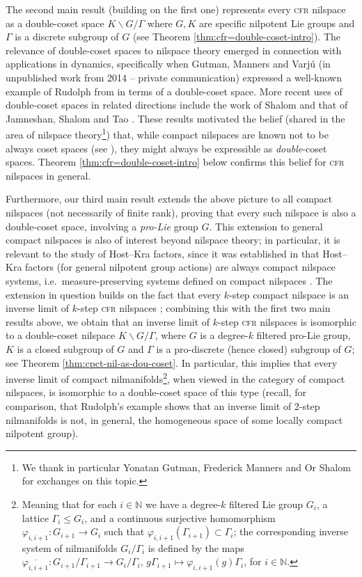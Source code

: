 \documentclass[a4paper,12pt,reqno]{amsart}
\theoremstyle{definition}
\def\to{\rightarrow}
\newcommand{\mb}{\mathbb}
\begin{document}
The second main result (building on the first one) represents every \textsc{cfr} nilspace as a double-coset space $K\backslash G / \Gamma$ where $G,K$ are specific nilpotent Lie groups and $\Gamma$ is a discrete subgroup of $G$ (see Theorem \ref{thm:cfr=double-coset-intro}). The relevance of double-coset spaces to nilspace theory emerged in connection with applications in dynamics, specifically when Gutman, Manners and Varjú (in unpublished work from 2014 -- private communication) expressed a well-known example of Rudolph from \cite{Rudolph} in terms of a double-coset space. More recent uses of double-coset spaces in related directions include the work of Shalom \cite[Theorem 1.21]{Shalom} and that of Jamneshan, Shalom and Tao \cite[Theorem 1.8]{JST1}. These results  motivated the belief (shared in the area of nilspace theory\footnote{We thank in particular Yonatan Gutman, Frederick Manners and Or Shalom for exchanges on this topic.}) that, while compact nilspaces are known not to be always coset spaces (see \cite[Example 6]{HK-par}), they might always be expressible as \emph{double}-coset spaces. Theorem \ref{thm:cfr=double-coset-intro} below confirms this belief for \textsc{cfr} nilspaces in general. 

Furthermore, our third main result extends the above picture to all compact nilspaces (not necessarily of finite rank), proving that every such nilspace is also a double-coset space, involving a \emph{pro-Lie} group $G$. This extension to general compact nilspaces is also of interest beyond nilspace theory; in particular, it is relevant to the study of Host--Kra factors, since it was established in \cite[Theorem 5.11]{CScouplings} that Host--Kra factors (for general nilpotent group actions) are always compact nilspace systems, i.e.\ measure-preserving systems defined on compact nilspaces \cite[Definition 5.10]{CScouplings}. The extension in question builds on the fact that every $k$-step compact nilspace is an inverse limit of $k$-step \textsc{cfr} nilspaces  \cite[Theorem 2.7.3]{Cand:Notes2}; combining this with the first two main results above, we obtain that an inverse limit of $k$-step \textsc{cfr} nilspaces is isomorphic to a double-coset nilspace $K\backslash G/\Gamma$, where $G$ is a degree-$k$ filtered pro-Lie group, $K$ is a closed subgroup of $G$ and $\Gamma$ is a pro-discrete (hence closed) subgroup of $G$; see Theorem \ref{thm:cpct-nil-as-dou-coset}. In particular, this implies that every inverse limit of compact nilmanifolds\footnote{Meaning that for each $i\in \mb{N}$ we have a degree-$k$ filtered Lie group $G_i$, a lattice $\Gamma_i\le G_i$, and a continuous surjective homomorphism $\varphi_{i,i+1}:G_{i+1}\to G_i$ such that $\varphi_{i,i+1}(\Gamma_{i+1})\subset\Gamma_i$; the corresponding inverse system of nilmanifolds $G_i/\Gamma_i$ is defined by the maps $\overline{\varphi_{i,i+1}}:G_{i+1}/\Gamma_{i+1}\to G_i/\Gamma_i$, $g\Gamma_{i+1}\mapsto \varphi_{i,i+1}(g)\Gamma_i$, for $i\in \mb{N}$.}, when viewed in the category of compact nilspaces, is isomorphic to a double-coset space of this type (recall, for comparison, that Rudolph's example \cite{Rudolph} shows that an inverse limit of 2-step nilmanifolds is not, in general, the homogeneous space of some locally compact nilpotent group).
\end{document}
